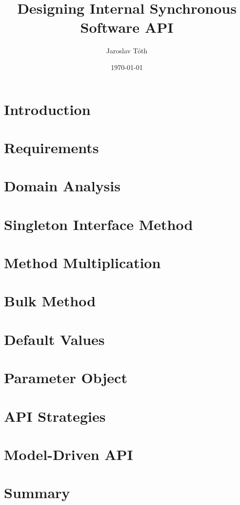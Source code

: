 \documentclass[11pt]{article}
\title{Designing Internal Synchronous Software API}
\author{Jaroslav Tóth}
\date{\today}
\begin{document}
\maketitle

\section{Introduction}
\label{sec:introduction}


\section{Requirements}
\label{sec:requirements}


\section{Domain Analysis}
\label{sec:domain}


\section{Singleton Interface Method}
\label{sec:singleton_interface_method}


\section{Method Multiplication}
\label{sec:method_multiplication}


\section{Bulk Method}
\label{sec:bulk_method}


\section{Default Values}
\label{sec:default_values}


\section{Parameter Object}
\label{sec:parameter_object}


\section{API Strategies}
\label{sec:api_strategies}


\section{Model-Driven API}
\label{sec:model_driven_api}


\section{Summary}
\label{sec:summary}

\end{document}
